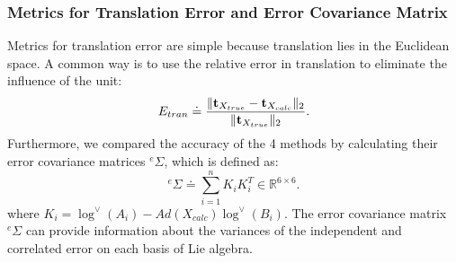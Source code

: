 \documentclass[twocolumn,10pt]{asme2ej}
\newcommand{\ttt}{{\bf t}}
\begin{document}
\subsubsection{Metrics for Translation Error and Error Covariance Matrix}
Metrics for translation error are simple because translation lies in the Euclidean space. A common way is to use the relative error in translation to eliminate the influence of the unit:
\begin{equation}
E_{tran} \doteq \dfrac{\|\ttt_{X_{true}}-\ttt_{X_{calc}}\|_{2}}{\|\ttt_{X_{true}}\|_{2}}.
\label{TranError}
\end{equation}
Furthermore, we compared the accuracy of the 4 methods by calculating their error covariance matrices $^e\Sigma$, which is defined as:
\begin{equation}
^e\Sigma \doteq \sum_{i = 1}^{n}K_{i}K_{i}^{T} \in \mathbb{R}^{6 \times 6}.
\end{equation}
where $K_{i} = \log^{\vee}(A_{i}) - Ad(X_{calc})\log^{\vee}(B_{i})$.
The error covariance matrix $^e\Sigma$ can provide information about the variances of the independent and correlated error on each basis of Lie algebra. 
\end{document}

